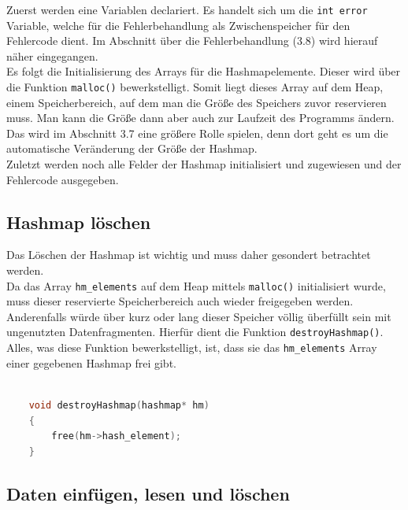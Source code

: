 \documentclass[11pt,a4paper]{article}
\begin{document}
Zuerst werden eine Variablen declariert. Es handelt sich um die \lstinline{int error} Variable, welche für die Fehlerbehandlung als 
Zwischenspeicher für den Fehlercode dient. Im Abschnitt über die Fehlerbehandlung (3.8) wird hierauf näher eingegangen.\\
Es folgt die Initialisierung des Arrays für die Hashmapelemente. Dieser wird über die Funktion \lstinline{malloc()} bewerkstelligt.
Somit liegt dieses Array auf dem Heap, einem Speicherbereich, auf dem man die Größe des Speichers zuvor reservieren muss. Man kann die Größe 
dann aber auch zur Laufzeit des Programms ändern. Das wird im Abschnitt 3.7 eine größere Rolle spielen, denn dort geht es um die automatische 
Veränderung der Größe der Hashmap.\\
Zuletzt werden noch alle Felder der Hashmap initialisiert und zugewiesen und der Fehlercode ausgegeben.

\subsection{Hashmap löschen}

    Das Löschen der Hashmap ist wichtig und muss daher gesondert betrachtet werden.\\
    Da das Array \lstinline{hm_elements} auf dem Heap mittels \lstinline{malloc()} initialisiert wurde, muss dieser reservierte Speicherbereich 
    auch wieder freigegeben werden. Anderenfalls würde über kurz oder lang dieser Speicher völlig überfüllt sein mit ungenutzten Datenfragmenten.
    Hierfür dient die Funktion \lstinline{destroyHashmap()}. Alles, was diese Funktion bewerkstelligt, ist, dass sie das \lstinline{hm_elements} 
    Array einer gegebenen Hashmap frei gibt.\\

\begin{lstlisting}[language=C]

    void destroyHashmap(hashmap* hm)
    {   
        free(hm->hash_element);
    }
\end{lstlisting}
\pagebreak

\subsection{Daten einfügen, lesen und löschen}
\end{document}
